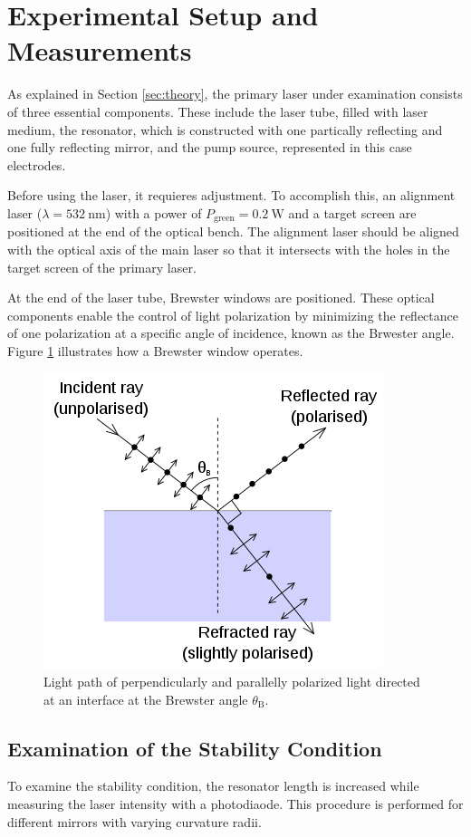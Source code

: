 \section{Experimental Setup and Measurements}

As explained in Section \ref{sec:theory}, the primary laser 
under examination consists of three essential components. These 
include the laser tube, filled with laser medium, the resonator, 
which is constructed with one partically reflecting and one 
fully reflecting mirror, and the pump source, represented in this 
case electrodes. 

Before using the laser, it requieres adjustment. To accomplish this, 
an alignment laser ($\lambda=\SI{532}{\nano\meter}$) with a power 
of $P_\text{green}=\SI{0.2}{\watt}$ and a target screen are positioned
at the end of the optical bench. The alignment laser should be aligned 
with the optical axis of the main laser so that it intersects with 
the holes in the target screen of the primary laser.  

At the end of the laser tube, Brewster windows are positioned. 
These optical components enable the control of light polarization
by minimizing the reflectance of one polarization at a specific
angle of incidence, known as the Brwester angle. Figure \ref{fig:brewster} 
illustrates how a Brewster window operates.

\begin{figure}
    \centering
    \includegraphics[width=0.5\linewidth]{pictures/Brewster.png} %
    \caption{Light path of perpendicularly and parallelly polarized light directed at an interface at the Brewster angle $\theta_\text{B}$. \cite{Brewster}}
    \label{fig:brewster}
\end{figure}

\subsection{Examination of the Stability Condition}
To examine the stability condition, the resonator length is increased
while measuring the laser intensity with a photodiaode. This 
procedure is performed for different mirrors with varying curvature 
radii.

